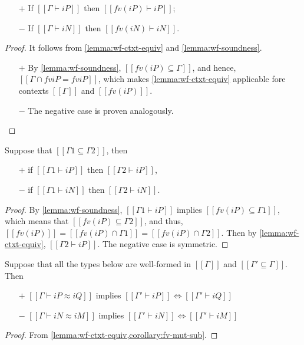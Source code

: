 \begin{corollary}
  \label{corollary:wf-ctxt-strengthening}
  \hfill
  
  \begin{itemize}
    \item [$+$] If $[[Γ ⊢ iP]]$ then $[[fv(iP) ⊢ iP]]$;
    \item [$-$] If $[[Γ ⊢ iN]]$ then $[[fv(iN) ⊢ iN]]$.
  \end{itemize}
\end{corollary}
\begin{proof}
  It follows from \cref{lemma:wf-ctxt-equiv} and \cref{lemma:wf-soundness}.
  \begin{itemize}
    \item [$+$] 
      By \cref{lemma:wf-soundness}, $[[fv(iP) ⊆ Γ]]$, and hence,
      $[[Γ ∩ fv iP = fv iP ]]$, which makes \cref{lemma:wf-ctxt-equiv}
      applicable fore contexts $[[Γ]]$ and $[[fv(iP)]]$.
    \item[$-$] The negative case is proven analogously.
  \end{itemize}
\end{proof}

\begin{corollary}
  \label{lemma:wf-weakening}
  Suppose that $[[Γ1 ⊆ Γ2]]$, then
  \begin{itemize}
    \item[$+$] if $[[Γ1 ⊢ iP]]$ then $[[Γ2 ⊢ iP]]$,
    \item[$-$] if $[[Γ1 ⊢ iN]]$ then $[[Γ2 ⊢ iN]]$.
  \end{itemize}
\end{corollary}
\begin{proof}
  By \cref{lemma:wf-soundness},
  $[[Γ1 ⊢ iP]]$ implies $[[fv(iP) ⊆ Γ1]]$,
  which means that $[[fv(iP) ⊆ Γ2]]$,
  and thus, $[[fv(iP)]] = [[fv(iP) ∩ Γ1]] = [[fv(iP) ∩ Γ2]]$.
  Then by \cref{lemma:wf-ctxt-equiv}, $[[Γ2 ⊢ iP]]$. 
  The negative case is symmetric.
\end{proof}


\begin{corollary}
  \label{lemma:mut-sub-types-wf-equiv}
  Suppose that all the types below are well-formed in $[[Γ]]$ and
  $[[Γ' ⊆ Γ]]$. Then
  \begin{itemize}
  \item[$+$] $[[Γ ⊢ iP ≈ iQ]]$ implies $[[Γ' ⊢ iP]] \iff [[Γ' ⊢ iQ]]$
  \item[$-$] $[[Γ ⊢ iN ≈ iM]]$ implies $[[Γ' ⊢ iN]] \iff [[Γ' ⊢ iM]]$
  \end{itemize}
\end{corollary}
\begin{proof}
  From \cref{lemma:wf-ctxt-equiv,corollary:fv-mut-sub}.
\end{proof}


